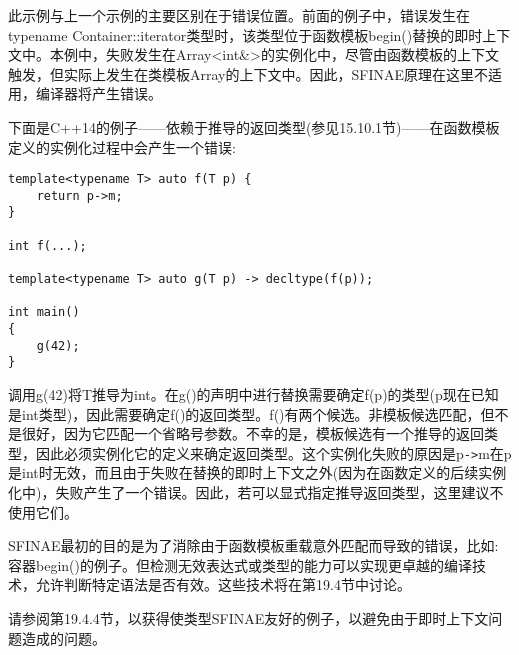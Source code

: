 此示例与上一个示例的主要区别在于错误位置。前面的例子中，错误发生在typename Container::iterator类型时，该类型位于函数模板begin()替换的即时上下文中。本例中，失败发生在Array<int\&>的实例化中，尽管由函数模板的上下文触发，但实际上发生在类模板Array的上下文中。因此，SFINAE原理在这里不适用，编译器将产生错误。

下面是C++14的例子——依赖于推导的返回类型(参见15.10.1节)——在函数模板定义的实例化过程中会产生一个错误:

\begin{lstlisting}[style=styleCXX]
template<typename T> auto f(T p) {
	return p->m;
}

int f(...);

template<typename T> auto g(T p) -> decltype(f(p));

int main()
{
	g(42);
}
\end{lstlisting}

调用g(42)将T推导为int。在g()的声明中进行替换需要确定f(p)的类型(p现在已知是int类型)，因此需要确定f()的返回类型。f()有两个候选。非模板候选匹配，但不是很好，因为它匹配一个省略号参数。不幸的是，模板候选有一个推导的返回类型，因此必须实例化它的定义来确定返回类型。这个实例化失败的原因是p\texttt{->}m在p是int时无效，而且由于失败在替换的即时上下文之外(因为在函数定义的后续实例化中)，失败产生了一个错误。因此，若可以显式指定推导返回类型，这里建议不使用它们。

SFINAE最初的目的是为了消除由于函数模板重载意外匹配而导致的错误，比如:容器begin()的例子。但检测无效表达式或类型的能力可以实现更卓越的编译技术，允许判断特定语法是否有效。这些技术将在第19.4节中讨论。

请参阅第19.4.4节，以获得使类型SFINAE友好的例子，以避免由于即时上下文问题造成的问题。




